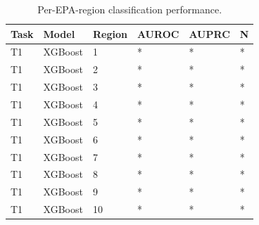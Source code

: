 \begin{table}
\caption{Per-EPA-region classification performance.}
\label{tab:regional}
\begin{tabular}{llllll}
\toprule
Task & Model & Region & AUROC & AUPRC & N \\
\midrule
T1 & XGBoost & 1 & * & * & * \\
T1 & XGBoost & 2 & * & * & * \\
T1 & XGBoost & 3 & * & * & * \\
T1 & XGBoost & 4 & * & * & * \\
T1 & XGBoost & 5 & * & * & * \\
T1 & XGBoost & 6 & * & * & * \\
T1 & XGBoost & 7 & * & * & * \\
T1 & XGBoost & 8 & * & * & * \\
T1 & XGBoost & 9 & * & * & * \\
T1 & XGBoost & 10 & * & * & * \\
\bottomrule
\end{tabular}
\end{table}
